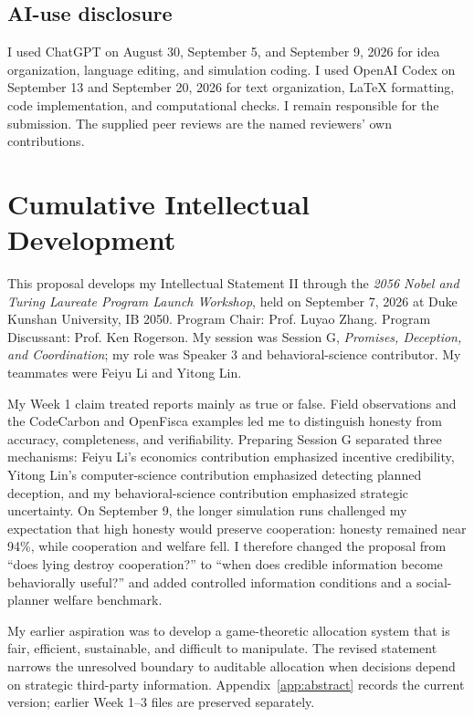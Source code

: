 \subsection{AI-use disclosure}
I used ChatGPT on August 30, September 5, and September 9, 2026 for idea organization, language editing, and simulation coding. I used OpenAI Codex on September 13 and September 20, 2026 for text organization, LaTeX formatting, code implementation, and computational checks. I remain responsible for the submission. The supplied peer reviews are the named reviewers' own contributions.

\section{Cumulative Intellectual Development}
This proposal develops my Intellectual Statement II through the \emph{2056 Nobel and Turing Laureate Program Launch Workshop}, held on September 7, 2026 at Duke Kunshan University, IB 2050. Program Chair: Prof. Luyao Zhang. Program Discussant: Prof. Ken Rogerson. My session was Session G, \emph{Promises, Deception, and Coordination}; my role was Speaker 3 and behavioral-science contributor. My teammates were Feiyu Li and Yitong Lin.

My Week 1 claim treated reports mainly as true or false. Field observations and the CodeCarbon and OpenFisca examples led me to distinguish honesty from accuracy, completeness, and verifiability. Preparing Session G separated three mechanisms: Feiyu Li's economics contribution emphasized incentive credibility, Yitong Lin's computer-science contribution emphasized detecting planned deception, and my behavioral-science contribution emphasized strategic uncertainty. On September 9, the longer simulation runs challenged my expectation that high honesty would preserve cooperation: honesty remained near 94\%, while cooperation and welfare fell. I therefore changed the proposal from ``does lying destroy cooperation?'' to ``when does credible information become behaviorally useful?'' and added controlled information conditions and a social-planner welfare benchmark.

My earlier aspiration was to develop a game-theoretic allocation system that is fair, efficient, sustainable, and difficult to manipulate. The revised statement narrows the unresolved boundary to auditable allocation when decisions depend on strategic third-party information. Appendix~\ref{app:abstract} records the current version; earlier Week 1--3 files are preserved separately.

